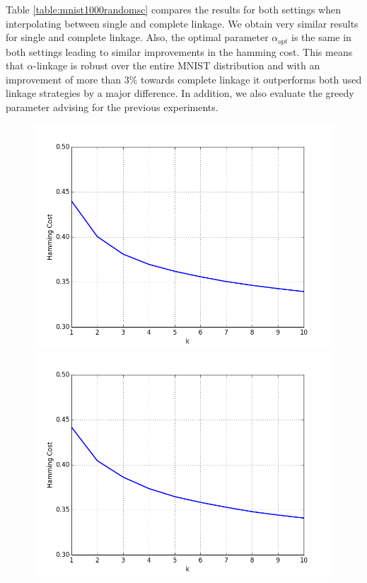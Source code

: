 Table \ref{table:mnist1000randomsc} compares the results for both settings when interpolating between single and complete linkage. We obtain very similar results for single and complete linkage. Also, the optimal parameter $\alpha_{opt}$ is the same in both settings leading to similar improvements in the hamming cost. This means that $\alpha$-linkage is robust over the entire MNIST distribution and with an improvement of more than $3\%$ towards complete linkage it outperforms both used linkage strategies by a major difference. In addition, we also evaluate the greedy parameter advising for the previous experiments.\\

\begin{figure}[H]
\centering
\begin{minipage}{.45\textwidth}
  \centering
  \includegraphics[width=\linewidth]{plots/mnist-sc-top-10}
\end{minipage}
\begin{minipage}{.45\textwidth}
  \centering
  \includegraphics[width=\linewidth]{plots/mnist-sc-random-top-10}
\end{minipage}
\caption{}
\label{fig:mnistsctop10}
\end{figure}

